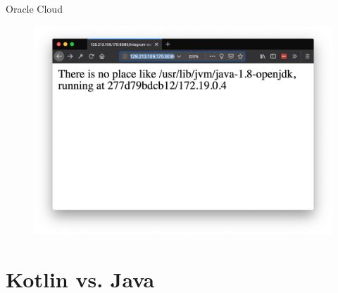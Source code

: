 \documentclass[aspectratio=169]{beamer}
\begin{document}
\begin{frame}{Oracle Cloud}

\begin{figure}
	\centering
	\includegraphics[width=\linewidth]{Images/oc4}
\end{figure}
\end{frame}

{
    \section{Kotlin vs. Java}
}
\end{document}
